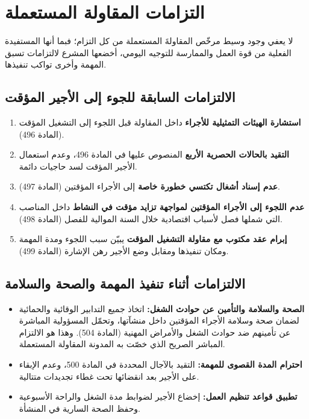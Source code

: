 \section{التزامات المقاولة المستعملة}

لا يعفي وجود وسيط مرخّص المقاولةَ المستعملة من كل التزام؛ فبما أنها المستفيدة الفعلية من قوة العمل والممارسة للتوجيه اليومي، أخضعها المشرع لالتزامات تسبق المهمة وأخرى تواكب تنفيذها.

\subsection{الالتزامات السابقة للجوء إلى الأجير المؤقت}
\begin{enumerate}[leftmargin=*, itemsep=5pt]
    \item \textbf{استشارة الهيئات التمثيلية للأجراء} داخل المقاولة قبل اللجوء إلى التشغيل المؤقت (المادة \textenglish{496}).
    \item \textbf{التقيد بالحالات الحصرية الأربع} المنصوص عليها في المادة \textenglish{496}، وعدم استعمال الأجير المؤقت لسد حاجيات دائمة.
    \item \textbf{عدم إسناد أشغال تكتسي خطورة خاصة} إلى الأجراء المؤقتين (المادة \textenglish{497}).
    \item \textbf{عدم اللجوء إلى الأجراء المؤقتين لمواجهة تزايد مؤقت في النشاط} داخل المناصب التي شملها فصل لأسباب اقتصادية خلال السنة الموالية للفصل (المادة \textenglish{498}).
    \item \textbf{إبرام عقد مكتوب مع مقاولة التشغيل المؤقت} يبيّن سبب اللجوء ومدة المهمة ومكان تنفيذها ومقابل وضع الأجير رهن الإشارة (المادة \textenglish{499}).
\end{enumerate}

\subsection{الالتزامات أثناء تنفيذ المهمة والصحة والسلامة}
\begin{itemize}[leftmargin=*, itemsep=5pt]
    \item \textbf{الصحة والسلامة والتأمين عن حوادث الشغل:} اتخاذ جميع التدابير الوقائية والحمائية لضمان صحة وسلامة الأجراء المؤقتين داخل منشآتها، وتحمّل المسؤولية المباشرة عن تأمينهم ضد حوادث الشغل والأمراض المهنية (المادة \textenglish{504}). وهذا هو الالتزام المباشر الصريح الذي خصّت به المدونة المقاولة المستعملة.
    \item \textbf{احترام المدة القصوى للمهمة:} التقيد بالآجال المحددة في المادة \textenglish{500}، وعدم الإبقاء على الأجير بعد انقضائها تحت غطاء تجديدات متتالية.
    \item \textbf{تطبيق قواعد تنظيم العمل:} إخضاع الأجير لضوابط مدة الشغل والراحة الأسبوعية وحفظ الصحة السارية في المنشأة.
\end{itemize}

